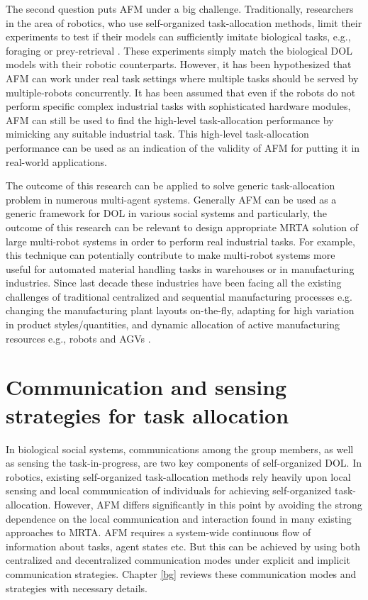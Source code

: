 The second question puts AFM under a big challenge. Traditionally, researchers in the area of robotics, who use self-organized task-allocation methods, limit their experiments to test if their models can sufficiently imitate biological tasks, e.g., foraging \cite{Krieger+2000} or prey-retrieval \cite{Labella2007}. These experiments simply match the biological DOL models with their robotic counterparts. However, it has been hypothesized that AFM can work under real task settings where multiple tasks should be served by multiple-robots concurrently. It has been assumed that even if the robots do not perform specific complex industrial tasks with sophisticated hardware modules, AFM can still be used to find the high-level task-allocation performance by mimicking any suitable industrial task. This high-level task-allocation performance can be used as an indication of the validity of AFM for putting it in real-world applications.

The outcome of this research can be applied to solve generic task-allocation problem in numerous multi-agent systems. Generally AFM can be used as a generic framework for DOL in various social systems and particularly,  the outcome of this research can be relevant to design appropriate MRTA solution of large multi-robot systems in order to perform real industrial tasks. For example, this technique can potentially contribute to make multi-robot systems more useful for automated material handling tasks in warehouses or in manufacturing industries. Since last decade these industries have been facing all the existing challenges of traditional centralized and sequential manufacturing processes e.g. changing the manufacturing plant layouts on-the-fly, adapting for high variation in product styles/quantities, and dynamic allocation of active manufacturing resources e.g., robots and \acfp{AGV} \cite{Shen+2006}.
\section{Communication and sensing strategies for task allocation}
\label{intro:comm}
In biological social systems, communications among the group members, as well as sensing the task-in-progress, are two key components of self-organized DOL. In robotics, existing self-organized task-allocation methods rely heavily upon local sensing and local communication of individuals for achieving self-organized task-allocation. However, AFM differs significantly in this point by avoiding the strong dependence on the local communication and interaction found in many existing approaches to MRTA. AFM requires a system-wide continuous flow of information about tasks, agent states etc. But this can be achieved by using both centralized and decentralized communication modes under explicit and implicit communication strategies. Chapter \ref{bg} reviews these communication modes and strategies with necessary details.

